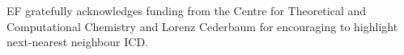 \begin{acknowledgements}
EF gratefully acknowledges funding from the Centre for Theoretical and
Computational Chemistry and Lorenz Cederbaum for encouraging to highlight
next-nearest neighbour ICD.
\end{acknowledgements}
